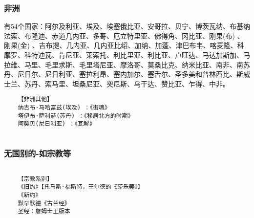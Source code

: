 \documentclass[UTF8]{../../RepresentationUniverse}
\begin{document}
\subsubsection{非洲}
有54个国家：阿尔及利亚、埃及、埃塞俄比亚、安哥拉、贝宁、博茨瓦纳、布基纳法索、布隆迪、赤道几内亚、多哥、厄立特里亚、佛得角、冈比亚、刚果(布) 、刚果(金) 、吉布提、几内亚、几内亚比绍、加纳、加蓬、津巴布韦、喀麦隆、科摩罗、科特迪瓦、肯尼亚、莱索托、利比里亚、利比亚、卢旺达、马达加斯加、马拉维、马里、毛里求斯、毛里塔尼亚、摩洛哥、莫桑比克、纳米比亚、南非、南苏丹、尼日尔、尼日利亚、塞拉利昂、塞内加尔、塞舌尔、圣多美和普林西比、斯威士兰、苏丹、索马里、坦桑尼亚、突尼斯、乌干达、赞比亚、乍得、中非。
\begin{lstlisting}
    【非洲其他】
    纳吉布·马哈富兹(埃及) ：《街魂》
    塔伊布·萨利赫(苏丹) ：《移居北方的时期》
    阿契贝(尼日利亚) ：《瓦解》
    
\end{lstlisting}


\subsubsection{无国别的-如宗教等}
\begin{lstlisting}

    【宗教系别】
    《旧约》【托马斯·福斯特，王尔德的《莎乐美》】
    《新约》
    默罕默德《古兰经》
    圣经：詹姆士王版本
\end{lstlisting}





\end{document}
